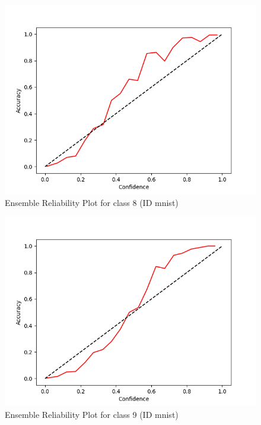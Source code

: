 \documentclass[11pt]{article}
\begin{document}
\begin{figure}[htbp]
\centering
\includegraphics[width=.9\linewidth]{./ens_mnist_rel_8.png}
\caption{\label{fig:org716d9d3}
Ensemble Reliability Plot for class 8 (ID mnist)}
\end{figure}

\begin{figure}[htbp]
\centering
\includegraphics[width=.9\linewidth]{./ens_mnist_rel_9.png}
\caption{\label{fig:org1229dcd}
Ensemble Reliability Plot for class 9 (ID mnist)}
\end{figure}
\end{document}
